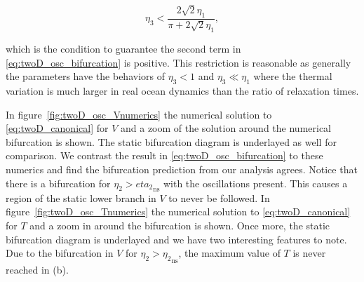 \begin{equation*}
\eta_3 <\frac{2\sqrt{2}\eta_1}{\pi+2\sqrt{2}\eta_1},
\end{equation*}

which is the condition to guarantee the second term in \eqref{eq:twoD_osc_bifurcation} is positive. This restriction is reasonable as generally the parameters have the behaviors of $\eta_3<1$ and $\eta_3\ll \eta_1$ where the thermal variation is much larger in real ocean dynamics than the ratio of relaxation times.

In figure~\ref{fig:twoD_osc_Vnumerics} the numerical solution to \eqref{eq:twoD_canonical} for $V$ and a zoom of the solution around the numerical bifurcation is shown. The static bifurcation diagram is underlayed as well for comparison. We contrast the result in \eqref{eq:twoD_osc_bifurcation} to these numerics and find the bifurcation prediction from our analysis agrees. Notice that there is a bifurcation for $\eta_2>{eta_2}_{\text{ns}}$ with the oscillations present. This causes a region of the static lower branch in $V$ to never be followed.
In figure~\ref{fig:twoD_osc_Tnumerics} the numerical solution to \eqref{eq:twoD_canonical} for $T$ and a zoom in around the bifurcation is shown. Once more, the static bifurcation diagram is underlayed and we have two interesting features to note. Due to the bifurcation in $V$ for $\eta_2>{\eta_2}_{\text{ns}}$, the maximum value of $T$ is never reached in (b).

